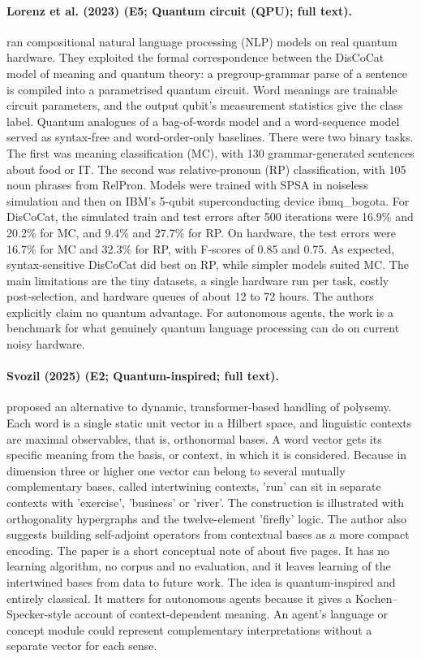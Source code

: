 \documentclass[10pt,a4paper]{article}
\begin{document}
\paragraph{Lorenz et al. (2023) (E5; Quantum circuit (QPU); full text).} \citet{Lorenz2023} ran compositional natural language processing (NLP) models on real quantum hardware. They exploited the formal correspondence between the DisCoCat model of meaning and quantum theory: a pregroup-grammar parse of a sentence is compiled into a parametrised quantum circuit. Word meanings are trainable circuit parameters, and the output qubit's measurement statistics give the class label. Quantum analogues of a bag-of-words model and a word-sequence model served as syntax-free and word-order-only baselines. There were two binary tasks. The first was meaning classification (MC), with 130 grammar-generated sentences about food or IT. The second was relative-pronoun (RP) classification, with 105 noun phrases from RelPron. Models were trained with SPSA in noiseless simulation and then on IBM's 5-qubit superconducting device ibmq\_bogota. For DisCoCat, the simulated train and test errors after 500 iterations were 16.9\% and 20.2\% for MC, and 9.4\% and 27.7\% for RP. On hardware, the test errors were 16.7\% for MC and 32.3\% for RP, with F-scores of 0.85 and 0.75. As expected, syntax-sensitive DisCoCat did best on RP, while simpler models suited MC. The main limitations are the tiny datasets, a single hardware run per task, costly post-selection, and hardware queues of about 12 to 72 hours. The authors explicitly claim no quantum advantage. For autonomous agents, the work is a benchmark for what genuinely quantum language processing can do on current noisy hardware.

\paragraph{Svozil (2025) (E2; Quantum-inspired; full text).} \citet{Svozil2025} proposed an alternative to dynamic, transformer-based handling of polysemy. Each word is a single static unit vector in a Hilbert space, and linguistic contexts are maximal observables, that is, orthonormal bases. A word vector gets its specific meaning from the basis, or context, in which it is considered. Because in dimension three or higher one vector can belong to several mutually complementary bases, called intertwining contexts, 'run' can sit in separate contexts with 'exercise', 'business' or 'river'. The construction is illustrated with orthogonality hypergraphs and the twelve-element 'firefly' logic. The author also suggests building self-adjoint operators from contextual bases as a more compact encoding. The paper is a short conceptual note of about five pages. It has no learning algorithm, no corpus and no evaluation, and it leaves learning of the intertwined bases from data to future work. The idea is quantum-inspired and entirely classical. It matters for autonomous agents because it gives a Kochen--Specker-style account of context-dependent meaning. An agent's language or concept module could represent complementary interpretations without a separate vector for each sense.
\end{document}
